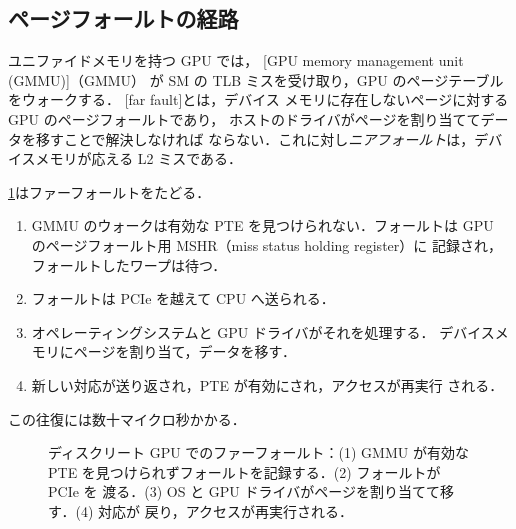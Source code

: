 \documentclass[../main.tex]{subfiles}
\begin{document}
\subsection{ページフォールトの経路}

\begin{definition}
  \label{def:l07-far-fault}
  ユニファイドメモリを持つ GPU では，
  [GPU memory management unit (GMMU)]（GMMU）
  が SM の TLB ミスを受け取り，GPU のページテーブルをウォークする．
  [far fault]とは，デバイス
  メモリに存在しないページに対する GPU のページフォールトであり，
  ホストのドライバがページを割り当ててデータを移すことで解決しなければ
  ならない．これに対し\emph{ニアフォールト}は，デバイスメモリが応える
  L2 ミスである．
\end{definition}

\cref{fig:l07-fault-path}はファーフォールトをたどる．
\begin{enumerate}
  \item GMMU のウォークは有効な PTE を見つけられない．フォールトは
    GPU のページフォールト用 MSHR（miss status holding register）に
    記録され，フォールトしたワープは待つ．
  \item フォールトは PCIe を越えて CPU へ送られる．
  \item オペレーティングシステムと GPU ドライバがそれを処理する．
    デバイスメモリにページを割り当て，データを移す．
  \item 新しい対応が送り返され，PTE が有効にされ，アクセスが再実行
    される．
\end{enumerate}
この往復には数十マイクロ秒かかる．

\begin{figure}[b]
  \centering
  
  \caption{ディスクリート GPU でのファーフォールト：(1) GMMU が有効な
    PTE を見つけられずフォールトを記録する．(2) フォールトが PCIe を
    渡る．(3) OS と GPU ドライバがページを割り当てて移す．(4) 対応が
    戻り，アクセスが再実行される．}
  \label{fig:l07-fault-path}
\end{figure}
\end{document}
